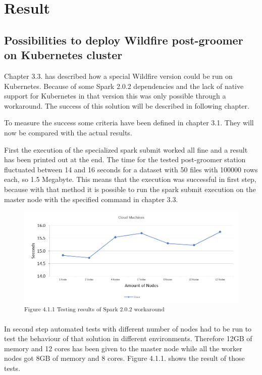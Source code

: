 
\chapter{Result}

\section{Possibilities to deploy Wildfire post-groomer on Kubernetes cluster}

Chapter 3.3. has described how a special Wildfire version could be run on Kubernetes. Because of some Spark 2.0.2 dependencies and the lack of native support for Kubernetes in that version this was only possible through a workaround. The success of this solution will be described in following chapter.

To measure the success some criteria have been defined in chapter 3.1. They will now be compared with the actual results.

First the execution of the specialized spark submit worked all fine and a result has been printed out at the end. The time for the tested post-groomer station fluctuated between 14 and 16 seconds for a dataset with 50 files with 100000 rows each, so 1.5 Megabyte. This means that the execution was successful in first step, because with that method it is possible to run the spark submit execution on the master node with the specified command in chapter 3.3.

\begin{figure}[b]
\centering
\includegraphics[width=\textwidth/5*4]{images/workaround_testing_results.png}
\textsuperscript{Figure 4.1.1 Testing results of Spark 2.0.2 workaround}
\end{figure}

In second step automated tests with different number of nodes had to be run to test the behaviour of that solution in different environments. Therefore 12GB of memory and 12 cores has been given to the master node while all the worker nodes got 8GB of memory and 8 cores. Figure 4.1.1. shows the result of those tests.

